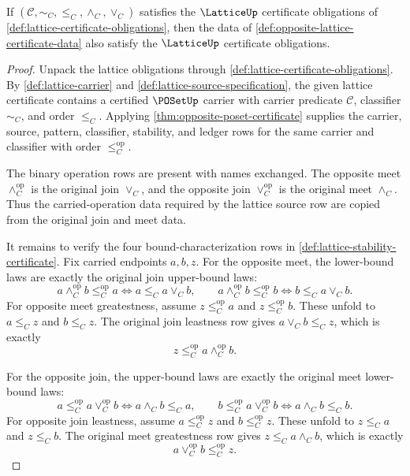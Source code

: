 \begin{theorem}
\label{thm:opposite-lattice-certificate}
If $(\mathcal C,\sim_C,\le_C,\wedge_C,\vee_C)$ satisfies the $\LatticeUp$ certificate obligations of \autoref{def:lattice-certificate-obligations}, then the data of \autoref{def:opposite-lattice-certificate-data} also satisfy the $\LatticeUp$ certificate obligations.
\end{theorem}
\begin{proof}
Unpack the lattice obligations through \autoref{def:lattice-certificate-obligations}. By \autoref{def:lattice-carrier} and \autoref{def:lattice-source-specification}, the given lattice certificate contains a certified $\POSetUp$ carrier with carrier predicate $\mathcal C$, classifier $\sim_C$, and order $\le_C$. Applying \autoref{thm:opposite-poset-certificate} supplies the carrier, source, pattern, classifier, stability, and ledger rows for the same carrier and classifier with order $\le_C^{\mathrm{op}}$.

The binary operation rows are present with names exchanged. The opposite meet $\wedge_C^{\mathrm{op}}$ is the original join $\vee_C$, and the opposite join $\vee_C^{\mathrm{op}}$ is the original meet $\wedge_C$. Thus the carried-operation data required by the lattice source row are copied from the original join and meet data.

It remains to verify the four bound-characterization rows in \autoref{def:lattice-stability-certificate}. Fix carried endpoints $a,b,z$. For the opposite meet, the lower-bound laws are exactly the original join upper-bound laws:
$$
a\wedge_C^{\mathrm{op}} b\le_C^{\mathrm{op}} a
\Longleftrightarrow
a\le_C a\vee_C b,
\qquad
 a\wedge_C^{\mathrm{op}} b\le_C^{\mathrm{op}} b
\Longleftrightarrow
b\le_C a\vee_C b.
$$
For opposite meet greatestness, assume $z\le_C^{\mathrm{op}} a$ and $z\le_C^{\mathrm{op}} b$. These unfold to $a\le_C z$ and $b\le_C z$. The original join leastness row gives $a\vee_C b\le_C z$, which is exactly
$$
z\le_C^{\mathrm{op}} a\wedge_C^{\mathrm{op}} b.
$$

For the opposite join, the upper-bound laws are exactly the original meet lower-bound laws:
$$
a\le_C^{\mathrm{op}} a\vee_C^{\mathrm{op}} b
\Longleftrightarrow
a\wedge_C b\le_C a,
\qquad
b\le_C^{\mathrm{op}} a\vee_C^{\mathrm{op}} b
\Longleftrightarrow
a\wedge_C b\le_C b.
$$
For opposite join leastness, assume $a\le_C^{\mathrm{op}} z$ and $b\le_C^{\mathrm{op}} z$. These unfold to $z\le_C a$ and $z\le_C b$. The original meet greatestness row gives $z\le_C a\wedge_C b$, which is exactly
$$
a\vee_C^{\mathrm{op}} b\le_C^{\mathrm{op}} z.
$$


\end{proof}
